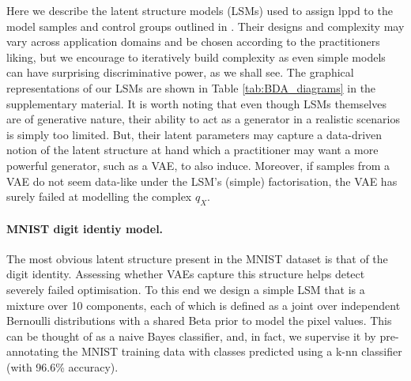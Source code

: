Here we describe the latent structure models (LSMs) used to assign lppd to the model samples and control groups outlined in . 
Their designs and complexity may vary across application domains and be chosen according to the practitioners liking, but we encourage to iteratively build complexity as even simple models can have surprising discriminative power, as we shall see. The graphical representations of our LSMs are shown in Table \ref{tab:BDA_diagrams} in the supplementary material. %
It is worth noting that even though LSMs themselves are of generative nature, their ability to act as a generator in a realistic scenarios is simply too limited. But, their latent parameters may capture a data-driven notion of the latent structure at hand which a practitioner may want a more powerful  generator, such as a VAE, to also induce. Moreover, if samples from a VAE do not seem data-like under the LSM's (simple) factorisation, the VAE has surely failed at modelling the complex $q_X$.




\paragraph{MNIST digit identiy model.}
The most obvious latent structure present in the MNIST dataset is that of the digit identity. Assessing whether VAEs capture this structure helps detect severely failed optimisation. To this end we design a simple LSM that is a mixture over 10 components, each of which is defined as a joint over independent Bernoulli distributions with a shared Beta prior to model the pixel values. This can be thought of as a naive Bayes classifier, and, in fact, we supervise it by pre-annotating the MNIST training data with classes predicted using a k-nn classifier (with 96.6\% accuracy).

